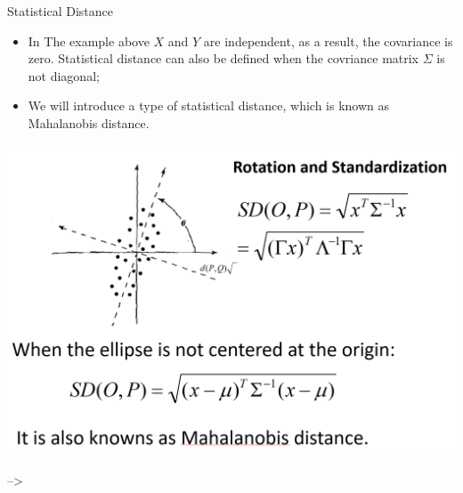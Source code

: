 \documentclass[
  ignorenonframetext,
]{beamer}
\providecommand{\tightlist}{%
  \setlength{\itemsep}{0pt}\setlength{\parskip}{0pt}}
\begin{document}
\begin{frame}{Statistical Distance}
\protect\hypertarget{statistical-distance}{}
\begin{itemize}
\tightlist
\item
  In The example above \(X\) and \(Y\) are independent, as a result, the
  covariance is zero. Statistical distance can also be defined when the
  covriance matrix \(\Sigma\) is not diagonal;
\item
  We will introduce a type of statistical distance, which is known as
  Mahalanobis distance.
\end{itemize}

\includegraphics[width=0.6\linewidth]{img/StatDistance}

--\textgreater{}
\end{frame}
\end{document}
